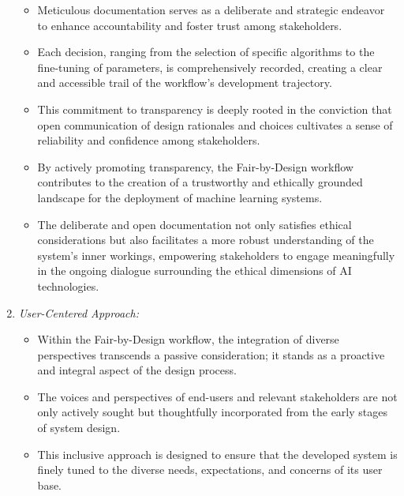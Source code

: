 \begin{enumerate}[label=\arabic*.]
\begin{itemize}
        \item Meticulous documentation serves as a deliberate and strategic endeavor to enhance accountability and foster trust among stakeholders.
       
        \item Each decision, ranging from the selection of specific algorithms to the fine-tuning of parameters, is comprehensively recorded, creating a clear and accessible trail of the workflow's development trajectory.
       
        \item This commitment to transparency is deeply rooted in the conviction that open communication of design rationales and choices cultivates a sense of reliability and confidence among stakeholders.
       
        \item By actively promoting transparency, the Fair-by-Design workflow contributes to the creation of a trustworthy and ethically grounded landscape for the deployment of machine learning systems.
       
        \item The deliberate and open documentation not only satisfies ethical considerations but also facilitates a more robust understanding of the system's inner workings, empowering stakeholders to engage meaningfully in the ongoing dialogue surrounding the ethical dimensions of AI technologies.
    
    \end{itemize}

    \item \emph{User-Centered Approach:}
   
    \begin{itemize}
      
        \item Within the Fair-by-Design workflow, the integration of diverse perspectives transcends a passive consideration; it stands as a proactive and integral aspect of the design process.
      
        \item The voices and perspectives of end-users and relevant stakeholders are not only actively sought but thoughtfully incorporated from the early stages of system design.
      
        \item This inclusive approach is designed to ensure that the developed system is finely tuned to the diverse needs, expectations, and concerns of its user base.
     

\end{itemize}
\end{enumerate}
